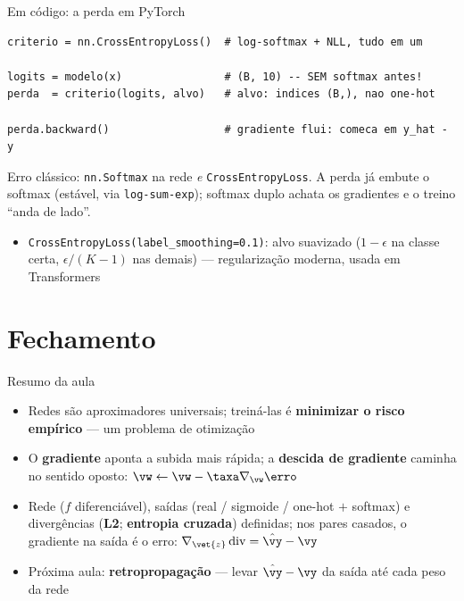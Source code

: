 \documentclass[aspectratio=169, 11pt]{beamer}
\begin{document}
\begin{frame}[fragile]{Em código: a perda em PyTorch}
\begin{lstlisting}
criterio = nn.CrossEntropyLoss()  # log-softmax + NLL, tudo em um

logits = modelo(x)                # (B, 10) -- SEM softmax antes!
perda  = criterio(logits, alvo)   # alvo: indices (B,), nao one-hot

perda.backward()                  # gradiente flui: comeca em y_hat - y
\end{lstlisting}

  \begin{alertabox}
    Erro clássico: \texttt{nn.Softmax} na rede \emph{e} \texttt{CrossEntropyLoss}.
    A perda já embute o softmax (estável, via \texttt{log-sum-exp}); softmax
    duplo achata os gradientes e o treino ``anda de lado''.
  \end{alertabox}

  \begin{itemize}\setlength{\itemsep}{0.2ex}
    \item \texttt{CrossEntropyLoss(label\_smoothing=0.1)}: alvo suavizado
          ($1-\epsilon$ na classe certa, $\epsilon/(K{-}1)$ nas demais) —
          regularização moderna, usada em Transformers
  \end{itemize}
\end{frame}

\section{Fechamento}

\begin{frame}{Resumo da aula}
  \begin{itemize}\setlength{\itemsep}{0.45ex}
    \item Redes são aproximadores universais; treiná-las é \textbf{minimizar
          o risco empírico} — um problema de otimização
    \item O \textbf{gradiente} aponta a subida mais rápida; a \textbf{descida
          de gradiente} caminha no sentido oposto:
          $\vw \leftarrow \vw - \taxa \nabla_{\vw} \erro$
    \item Rede ($f$ diferenciável), saídas (real / sigmoide / one-hot $+$
          softmax) e divergências (\textbf{L2}; \textbf{entropia cruzada})
          definidas; nos pares casados, o gradiente na saída é o erro:
          $\nabla_{\vet{z}}\, \mathrm{div} = \hat{\vy} - \vy$
    \item Próxima aula: \textbf{retropropagação} — levar $\hat{\vy} - \vy$
          da saída até cada peso da rede
  \end{itemize}
\end{frame}
\end{document}

